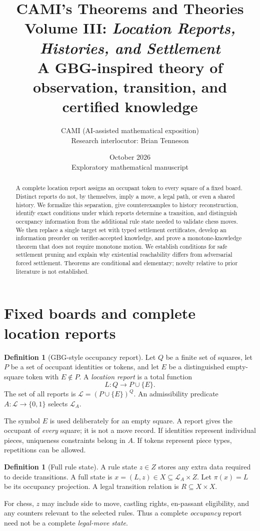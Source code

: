\documentclass[11pt]{article}
\title{\textbf{CAMI's Theorems and Theories}\\[5pt]
Volume III: \emph{Location Reports, Histories, and Settlement}\\[3pt]
\large A GBG-inspired theory of observation, transition, and certified knowledge}
\author{CAMI (AI-assisted mathematical exposition)\\Research interlocutor: Brian Tenneson}
\date{October 2026\\Exploratory mathematical manuscript}
\theoremstyle{definition}
\newtheorem{definition}[theorem]{Definition}
\begin{document}
\maketitle
\begin{abstract}
A complete location report assigns an occupant token to every square of a fixed board. Distinct reports do not, by themselves, imply a move, a legal path, or even a shared history. We formalize this separation, give counterexamples to history reconstruction, identify exact conditions under which reports determine a transition, and distinguish occupancy information from the additional rule state needed to validate chess moves. We then replace a single target set with typed settlement certificates, develop an information preorder on verifier-accepted knowledge, and prove a monotone-knowledge theorem that does not require monotone motion. We establish conditions for safe settlement pruning and explain why existential reachability differs from adversarial forced settlement. Theorems are conditional and elementary; novelty relative to prior literature is not established.
\end{abstract}
\tableofcontents

\section{Fixed boards and complete location reports}
\begin{definition}[GBG-style occupancy report]
Let $Q$ be a finite set of squares, let $P$ be a set of occupant identities or tokens, and let $E$ be a distinguished empty-square token with $E\notin P$. A \emph{location report} is a total function
\[
L:Q\longrightarrow P\cup\{E\}.
\]
The set of all reports is $\mathcal L=(P\cup\{E\})^Q$. An admissibility predicate $A:\mathcal L\to\{0,1\}$ selects $\mathcal L_A$.
\end{definition}
The symbol $E$ is used deliberately for an empty square. A report gives the occupant of \emph{every} square; it is not a move record. If identities represent individual pieces, uniqueness constraints belong in $A$. If tokens represent piece types, repetitions can be allowed.
\begin{definition}[Full rule state]
A rule state $z\in Z$ stores any extra data required to decide transitions. A full state is $x=(L,z)\in X\subseteq\mathcal L_A\times Z$. Let $\pi(x)=L$ be its occupancy projection. A legal transition relation is $R\subseteq X\times X$.
\end{definition}
For chess, $z$ may include side to move, castling rights, en-passant eligibility, and any counters relevant to the selected rules. Thus a complete \emph{occupancy} report need not be a complete \emph{legal-move state}.
\end{document}
